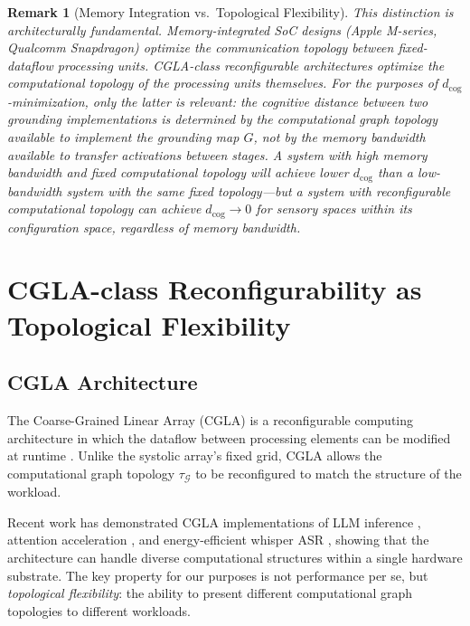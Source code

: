 \documentclass[12pt]{article}
\newtheorem{remark}{Remark}
\begin{document}
\begin{remark}[Memory Integration vs.\ Topological Flexibility]
This distinction is architecturally fundamental. Memory-integrated
SoC designs (Apple M-series, Qualcomm Snapdragon) optimize the
\emph{communication} topology between fixed-dataflow processing
units. CGLA-class reconfigurable architectures optimize the
\emph{computational} topology of the processing units themselves.
For the purposes of $d_{\mathrm{cog}}$-minimization, only the
latter is relevant: the cognitive distance between two grounding
implementations is determined by the computational graph topology
available to implement the grounding map $G$, not by the
memory bandwidth available to transfer activations between stages.
A system with high memory bandwidth and fixed computational topology
will achieve lower $d_{\mathrm{cog}}$ than a low-bandwidth system
with the same fixed topology---but a system with reconfigurable
computational topology can achieve $d_{\mathrm{cog}} \to 0$ for
sensory spaces within its configuration space, regardless of
memory bandwidth.
\end{remark}

\section{CGLA-class Reconfigurability as Topological Flexibility}

\subsection{CGLA Architecture}

The Coarse-Grained Linear Array (CGLA) is a reconfigurable computing
architecture in which the dataflow between processing elements can be
modified at runtime \cite{akabe2025, ando2026}. Unlike the systolic
array's fixed grid, CGLA allows the computational graph topology
$\tau_{\mathcal{G}}$ to be reconfigured to match the structure of the
workload.

Recent work has demonstrated CGLA implementations of LLM inference
\cite{ando2026_llm}, attention acceleration \cite{takeuchi2025}, and
energy-efficient whisper ASR \cite{ando2025_whisper}, showing that the
architecture can handle diverse computational structures within a single
hardware substrate. The key property for our purposes is not performance
per se, but \emph{topological flexibility}: the ability to present
different computational graph topologies to different workloads.
\end{document}

